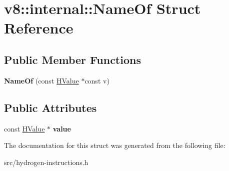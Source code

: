 \hypertarget{structv8_1_1internal_1_1_name_of}{}\section{v8\+:\+:internal\+:\+:Name\+Of Struct Reference}
\label{structv8_1_1internal_1_1_name_of}
\subsection*{Public Member Functions}
\begin{DoxyCompactItemize}
\item 
\hypertarget{structv8_1_1internal_1_1_name_of_a966e665de668aa9a763dc6224b99ce20}{}{\bfseries Name\+Of} (const \hyperlink{classv8_1_1internal_1_1_h_value}{H\+Value} $\ast$const v)\label{structv8_1_1internal_1_1_name_of_a966e665de668aa9a763dc6224b99ce20}

\end{DoxyCompactItemize}
\subsection*{Public Attributes}
\begin{DoxyCompactItemize}
\item 
\hypertarget{structv8_1_1internal_1_1_name_of_ae83f6dad7226825fcc57894c14b07f0f}{}const \hyperlink{classv8_1_1internal_1_1_h_value}{H\+Value} $\ast$ {\bfseries value}\label{structv8_1_1internal_1_1_name_of_ae83f6dad7226825fcc57894c14b07f0f}

\end{DoxyCompactItemize}


The documentation for this struct was generated from the following file\+:\begin{DoxyCompactItemize}
\item 
src/hydrogen-\/instructions.\+h\end{DoxyCompactItemize}
